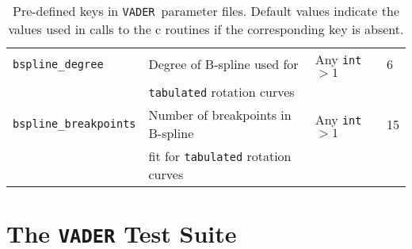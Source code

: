 \documentclass[12pt]{article}
\newcommand{\vader}{\texttt{VADER}}
\begin{document}
\begin{table}
\begin{center}
\begin{tabular}{|l|l|l|l|}
\verb=bspline_degree= & Degree of B-spline used for & Any \verb=int= $>1$ & 6 \\
& \verb=tabulated= rotation curves & & \\ \hline
\verb=bspline_breakpoints= & Number of breakpoints in B-spline & Any \verb=int= $>1$ & 15 \\
& fit for \verb=tabulated= rotation curves & & \\
\hline\hline
\end{tabular}
\end{center}
\caption{
\label{tab:keys}
Pre-defined keys in \vader\ parameter files. Default values indicate the values used in calls to the c routines if the corresponding key is absent.
}
\end{table}

\section{The \texttt{VADER} Test Suite}
\end{document}
